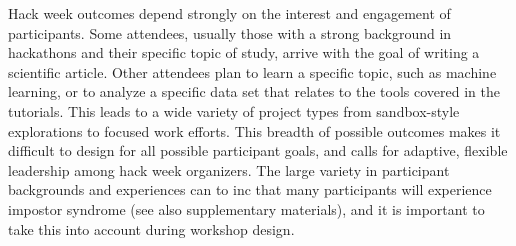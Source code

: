 Hack week outcomes depend strongly on the interest and engagement of participants.
Some attendees, usually those with a strong background in hackathons and their specific topic of study, arrive with the goal of writing a scientific article.
Other attendees plan to learn a specific topic, such as machine learning, or to analyze a specific data set that relates to the tools covered in the tutorials.
This leads to a wide variety of project types from sandbox-style explorations to focused work efforts.
This breadth of possible outcomes makes it difficult to design for all possible participant goals, and calls for adaptive, flexible leadership among hack week organizers.
The large variety in participant backgrounds and experiences can to inc that many participants will experience impostor syndrome (see also supplementary materials), and it 
is important to take this into account during workshop design.
